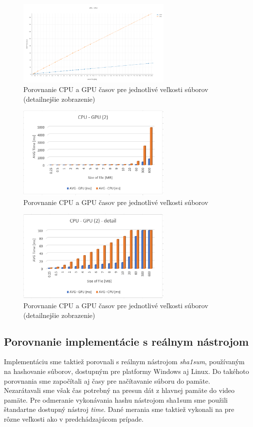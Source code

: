 \documentclass[conference]{IEEEtran}
\begin{document}
\begin{figure}[h!]
\centering
\includegraphics[width=3in]{img/CPU-GPU-new2}
\caption{Porovnanie CPU a GPU časov pre jednotlivé veľkosti súborov (detailnejšie zobrazenie)}
\end{figure}

\begin{figure}[h!]
\centering
\includegraphics[width=3in]{img/CPU-GPU2}
\caption{Porovnanie CPU a GPU časov pre jednotlivé veľkosti súborov}
\end{figure}

\begin{figure}[h!]
\centering
\includegraphics[width=3in]{img/CPU-GPUdetail2}
\caption{Porovnanie CPU a GPU časov pre jednotlivé veľkosti súborov (detailnejšie zobrazenie)}
\end{figure}


\subsection{Porovnanie implementácie s reálnym nástrojom}

Implementáciu sme taktiež porovnali s reálnym nástrojom \textit{sha1sum}, používaným na hashovanie súborov, dostupným pre platformy Windows aj Linux. Do takéhoto porovnania sme započítali aj časy pre načítavanie súboru do pamäte. Nezarátavali sme však čas potrebný na presun dát z hlavnej pamäte do video pamäte. Pre odmeranie vykonávania hashu nástrojom sha1sum sme použili štandartne dostupný nástroj \textit{time}. Dané merania sme taktiež vykonali na pre rôzne veľkosti ako v predchádzajúcom prípade. 
\end{document}
